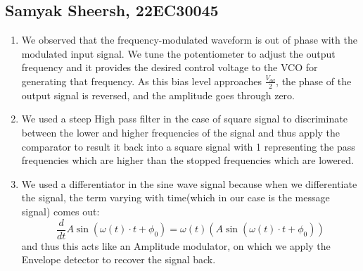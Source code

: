 \documentclass{article}
\begin{document}
\subsection{Samyak Sheersh, 22EC30045}
\begin{enumerate}
  \item We observed that the frequency-modulated waveform is out of phase with the modulated input signal. We tune the potentiometer to adjust the output frequency and it provides the desired control voltage to the VCO for generating that frequency. As this bias level approaches $\frac{V_{dd}}{2}$, the phase of the output signal is reversed, and the amplitude goes through zero.
  \item We used a steep High pass filter in the case of square signal to discriminate between the lower and higher frequencies of the signal and thus apply the comparator to result it back into a square signal with 1 representing the pass frequencies which are higher than the stopped frequencies which are lowered. 
  \item We used a differentiator in the sine wave signal because when we differentiate the signal, the term varying with time(which in our case is the message signal) comes out:
    \begin{equation}
        \frac{d}{dt}A\sin(\omega(t)\cdot t +\phi_0)= \omega(t) (A\sin(\omega(t)\cdot t +\phi_0))
    \end{equation}
  and thus this acts like an Amplitude modulator, on which we apply the Envelope detector to recover the signal back. 

\end{enumerate}
\end{document}
